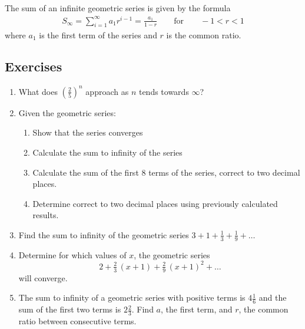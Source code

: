 The sum of an infinite geometric series is given by the formula
\begin{eqnarray}
\label{eq:mp:se:ig:4}
\boxed{S_\infty = \sum_{i=1}^\infty a_1r^{i-1} = \frac {a_1}{1-r} \qquad \mathrm{ for } \qquad -1<r<1 }
\end{eqnarray}
where $a_1$ is the first term of the series and $r$ is the common ratio.

\subsection{Exercises}
\begin{enumerate}
\item What does $(\tfrac{2}{5})^n$ approach as $n$ tends towards $\infty$?
\item{Given the geometric series:
\begin{enumerate}
\item Show that the series converges
\item Calculate the sum to infinity of the series
\item Calculate the sum of the first 8 terms of the series, correct to two decimal places.
\item Determine
correct to two decimal places using previously calculated results.
\end{enumerate}}
\item Find the sum to infinity of the geometric series $3 + 1 + \tfrac{1}{3} + \tfrac{1}{9} + \ldots$
\item Determine for which values of $x$, the geometric series $$2 + \tfrac{2}{3} \, (x+1) +\tfrac{2}{9} \, (x+1)^2 + \ldots$$ will converge.
\item The sum to infinity of a geometric series with positive terms is $4\tfrac{1}{6}$ and the sum of the first two terms is $2\tfrac{2}{3}$. Find $a$, the first term, and $r$, the common ratio between consecutive terms.
\end{enumerate}


